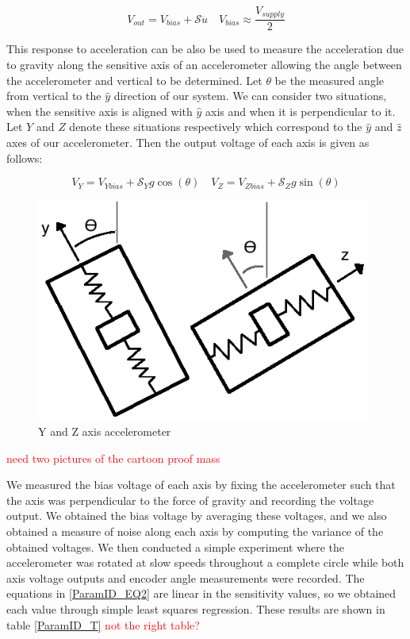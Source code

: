 \documentclass{article}
\newcommand{\xxx}[1]{\textcolor{red}{#1}}
\theoremstyle{plain}
\theoremstyle{definition}
\theoremstyle{remark}
\newcommand{\Sens}{\mathcal{S}}
\begin{document}
\begin{equation}
V_{out} = V_{bias} + \Sens \ddot{u} \quad V_{bias} \approx \frac{V_{supply}}{2}
\label{ParamID_EQ1}
\end{equation}

This response to acceleration can be also be used to measure the acceleration due to gravity along the sensitive axis of an accelerometer allowing the angle between the accelerometer and vertical to be determined.  Let $\theta$ be the measured angle from vertical to the $\hat{y}$ direction of our system.  We can consider two situations, when the sensitive axis is aligned with $\hat{y}$ axis and when it is perpendicular to it.  Let $Y$ and $Z$ denote these situations respectively which correspond to the $\hat{y}$ and $\hat{z}$ axes of our accelerometer.  Then the output voltage of each axis is given as follows:

\begin{equation}
V_{Y} = V_{Ybias} + \Sens_{Y} g \cos(\theta) \quad V_{Z} = V_{Zbias} + \Sens_{Z} g \sin(\theta)
\label{ParamID_EQ2}
\end{equation}

\begin{figure}
\begin{center}
\includegraphics[width = 11cm]{Accelerometer_Cartoon.png}
\caption{Y and Z axis accelerometer}
\label{Accel_cartoon}
\end{center}
\end{figure}

\xxx{need two pictures of the cartoon proof mass}

We measured the bias voltage of each axis by fixing the accelerometer such that the axis was perpendicular to the force of gravity and recording the voltage output.  We obtained the bias voltage by averaging these voltages, and we also obtained a measure of noise along each axis by computing the variance of the obtained voltages.  We then conducted a simple experiment where the accelerometer was rotated at slow speeds throughout a complete circle while both axis voltage outputs and encoder angle measurements were recorded.  The equations in \ref{ParamID_EQ2} are linear in the sensitivity values, so we obtained each value through simple least squares regression.  These results are shown in table \ref{ParamID_T} \xxx{not the right table?} \\
\end{document}
